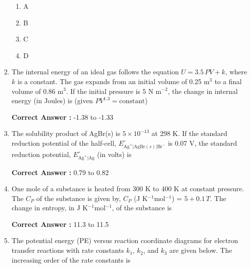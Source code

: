 \documentclass[journal,12pt,onecolumn]{exam}
\theoremstyle{remark}
\newcommand{\correct}{\textcolor{correctgreen}{\checkmark}}
\newcommand{\wrong}{\textcolor{wrongred}{\ding{55}}} %
\begin{document}
\begin{enumerate}
\hfill{}

\begin{multicols}{2}
\begin{enumerate}
    \item \wrong A
    \item \wrong B
    \item \wrong C
    \item \correct D
\end{enumerate}
\end{multicols}


\item 
The internal energy of an ideal gas follows the equation $U = 3.5 \, PV + k$, where $k$ is a constant. The gas expands from an initial volume of 0.25 m$^3$ to a final volume of 0.86 m$^3$. If the initial pressure is 5 N m$^{-2}$, the change in internal energy (in Joules) is (given $PV^{1.3} = \text{constant}$) \underline{\hspace{3cm}}

\hfill{}

\textbf{Correct Answer :} \textcolor{green!60!black}{-1.38 to -1.33}


\item 
The solubility product of AgBr(s) is $5 \times 10^{-13}$ at 298 K. If the standard reduction potential of the half-cell, $E^\circ_{\text{Ag}^+|\text{AgBr}(s)|\text{Br}^-}$ is 0.07 V, the standard reduction potential, $E^\circ_{\text{Ag}^+|\text{Ag}}$ (in volts) is \underline{\hspace{3cm}}

\hfill{}

\textbf{Correct Answer :} \textcolor{green!60!black}{0.79 to 0.82}


\item 
One mole of a substance is heated from 300 K to 400 K at constant pressure. The $C_P$ of the substance is given by, $C_P$ (J K$^{-1}$mol$^{-1}$) = $5 + 0.1\,T$. The change in entropy, in J K$^{-1}$mol$^{-1}$, of the substance is \underline{\hspace{3cm}}

\hfill{}

\textbf{Correct Answer :} \textcolor{green!60!black}{11.3 to 11.5}




\item 
The potential energy (PE) versus reaction coordinate diagrams for electron transfer reactions with rate constants $k_1$, $k_2$, and $k_3$ are given below. The increasing order of the rate constants is


\end{enumerate}
\end{document}
